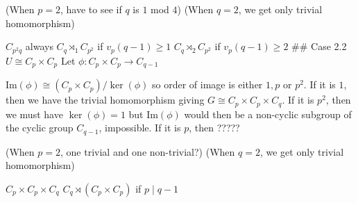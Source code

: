 (When $p = 2$, have to see if $q$ is $1$ mod $4$)
(When $q = 2$, we get only trivial homomorphism)

$C_{p^2q}$ always
$C_q \rtimes_1 C_{p^2}$ if $v_p(q - 1) \geq 1$
$C_q \rtimes_2 C_{p^2}$ if $v_p(q - 1) \geq 2$
## Case 2.2 $U \cong C_p \times C_p$
Let $\phi : C_p \times C_p \rightarrow C_{q-1}$

$\text{Im}(\phi) \cong (C_p \times C_p) / \ker(\phi)$ so order of image is either $1, p$ or $p^2$. If it is $1$, then we have the trivial homomorphism giving $G \cong C_p \times C_p \times C_{q}$. If it is $p^2$, then we must have $\ker(\phi) = 1$ but $\text{Im}(\phi)$ would then be a non-cyclic subgroup of the cyclic group $C_{q-1}$, impossible. If it is $p$, then ?????

(When $p = 2$, one trivial and one non-trivial?)
(When $q = 2$, we get only trivial homomorphism)

$C_p \times C_p \times C_q$
$C_q \rtimes (C_p \times C_p)$ if $p \mid q - 1$